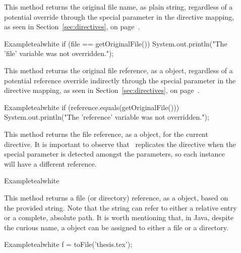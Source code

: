 \begin{description}
\item[] This method returns the original file name, as plain string, regardless of a potential override through the special  parameter in the directive mapping, as seen in Section~\ref{sec:directives}, on page~\pageref{sec:directives}.

\begin{codebox}{Example}{teal}{\icnote}{white}
if (file == getOriginalFile()) {
    System.out.println("The 'file' variable
       was not overridden.");
}
\end{codebox}

\item[] This method returns the original file reference, as a  object, regardless of a potential reference override indirectly through the special  parameter in the directive mapping, as seen in Section~\ref{sec:directives}, on page~\pageref{sec:directives}.

\begin{codebox}{Example}{teal}{\icnote}{white}
if (reference.equals(getOriginalFile())) {
    System.out.println("The 'reference' variable
       was not overridden.");
}
\end{codebox}

\item[] This method returns the file reference, as a  object, for the current directive. It is important to observe that \arara\ replicates the directive when the special  parameter is detected amongst the parameters, so each instance will have a different reference.

\begin{codebox}{Example}{teal}{\icnote}{white}
\end{codebox}

\item[] This method returns a file (or directory) reference, as a  object, based on the provided string. Note that the string can refer to either a relative entry or a complete, absolute path. It is worth mentioning that, in Java, despite the curious name, a  object can be assigned to either a file or a directory.

\begin{codebox}{Example}{teal}{\icnote}{white}
f = toFile('thesis.tex');
\end{codebox}


\end{description}

